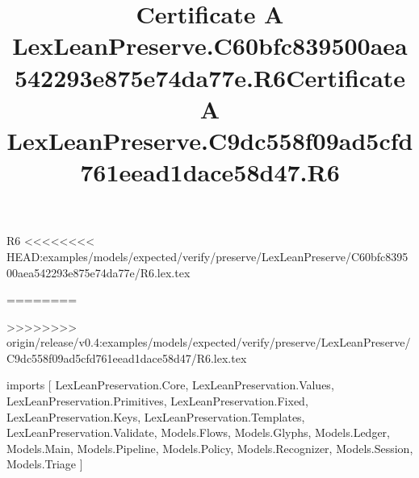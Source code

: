 \begin{lexlean}{R6}
<<<<<<<< HEAD:examples/models/expected/verify/preserve/LexLeanPreserve/C60bfc839500aea542293e875e74da77e/R6.lex.tex
\title{Certificate A LexLeanPreserve.C60bfc839500aea542293e875e74da77e.R6}
========
\title{Certificate A LexLeanPreserve.C9dc558f09ad5cfd761eead1dace58d47.R6}
>>>>>>>> origin/release/v0.4:examples/models/expected/verify/preserve/LexLeanPreserve/C9dc558f09ad5cfd761eead1dace58d47/R6.lex.tex
\begin{coremodule}
imports [
  LexLeanPreservation.Core,
  LexLeanPreservation.Values,
  LexLeanPreservation.Primitives,
  LexLeanPreservation.Fixed,
  LexLeanPreservation.Keys,
  LexLeanPreservation.Templates,
  LexLeanPreservation.Validate,
  Models.Flows,
  Models.Glyphs,
  Models.Ledger,
  Models.Main,
  Models.Pipeline,
  Models.Policy,
  Models.Recognizer,
  Models.Session,
  Models.Triage
]


\end{coremodule}
\end{lexlean}
